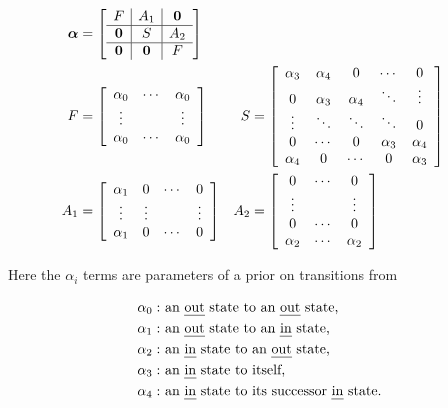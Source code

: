 \documentclass[12pt]{report}
\newcommand{\1}[0]{\mathbbm{1}}
\begin{document}
\begin{align*}
    \bm{\alpha} &= \left[\begin{array}{c | c | c}
        F & A_1 & \bm{0} \\\hline
        \bm{0} & S & A_2 \\\hline
        \bm{0} & \bm{0} & F
    \end{array}\right] \\
    F &= \left[\begin{array}{c c c}
        \alpha_0 & \cdots & \alpha_0 \\
        \vdots   &        & \vdots \\
        \alpha_0 & \cdots & \alpha_0
    \end{array}\right] &
    S &= \left[\begin{array}{c c c c c}
        \alpha_3 & \alpha_4 & 0        & \cdots   & 0        \\
        0        & \alpha_3 & \alpha_4 & \ddots   & \vdots   \\
        \vdots   & \ddots   & \ddots   & \ddots   & 0        \\
        0        & \cdots   & 0        & \alpha_3 & \alpha_4 \\
        \alpha_4 & 0        & \cdots   & 0        & \alpha_3
    \end{array}\right] \\
    A_1 &= \left[\begin{array}{c c c c}
        \alpha_1 & 0      & \cdots & 0 \\
        \vdots   & \vdots &        & \vdots \\
        \alpha_1 & 0      & \cdots & 0
    \end{array}\right] &
    A_2 &= \left[\begin{array}{c c c}
        0        & \cdots & 0 \\
        \vdots   &        & \vdots \\
        0        & \cdots & 0 \\
        \alpha_2 & \cdots & \alpha_2
    \end{array}\right]
\end{align*}

Here the $\alpha_i$ terms are parameters of a prior on transitions from

\begin{align*}
    \alpha_0: & \text{ an \emph{out} state to an \emph{out} state,}\\
    \alpha_1: & \text{ an \emph{out} state to an \emph{in} state,}\\
    \alpha_2: & \text{ an \emph{in} state to an \emph{out} state,}\\
    \alpha_3: & \text{ an \emph{in} state to itself,}\\
    \alpha_4: & \text{ an \emph{in} state to its successor \emph{in} state.}\\
\end{align*}
\end{document}
